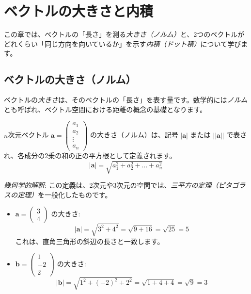 \section{ベクトルの大きさと内積} \setcounter{ex}{0}

この章では、ベクトルの「長さ」を測る\emph{大きさ（ノルム）}と、2つのベクトルがどれくらい「同じ方向を向いているか」を示す\emph{内積（ドット積）}について学びます。

\subsection{ベクトルの大きさ（ノルム）}

ベクトルの\emph{大きさ}は、そのベクトルの「長さ」を表す量です。数学的には\emph{ノルム}とも呼ばれ、ベクトル空間における距離の概念の基礎となります。

\begin{dfn} \label{norm}
$n$次元ベクトル $\bm{a} = \begin{pmatrix} a_1 \\ a_2 \\ \vdots \\ a_n \end{pmatrix}$ の大きさ（ノルム）は、記号 $|\bm{a}|$ または $||\bm{a}||$ で表され、各成分の2乗の和の正の平方根として定義されます。
\[|\bm{a}| = \sqrt{a_1^2 + a_2^2 + \dots + a_n^2}\]
\end{dfn}

\emph{幾何学的解釈}: この定義は、2次元や3次元の空間では、\emph{三平方の定理（ピタゴラスの定理）}を一般化したものです。

\begin{ex}
\begin{itemize}
\item $\bm{a} = \begin{pmatrix} 3 \\ 4 \end{pmatrix}$ の大きさ:
    \[|\bm{a}| = \sqrt{3^2 + 4^2} = \sqrt{9 + 16} = \sqrt{25} = 5\]
    これは、直角三角形の斜辺の長さと一致します。
\item $\bm{b} = \begin{pmatrix} 1 \\ -2 \\ 2 \end{pmatrix}$ の大きさ:
    \[|\bm{b}| = \sqrt{1^2 + (-2)^2 + 2^2} = \sqrt{1 + 4 + 4} = \sqrt{9} = 3\]
\end{itemize}
\end{ex}

